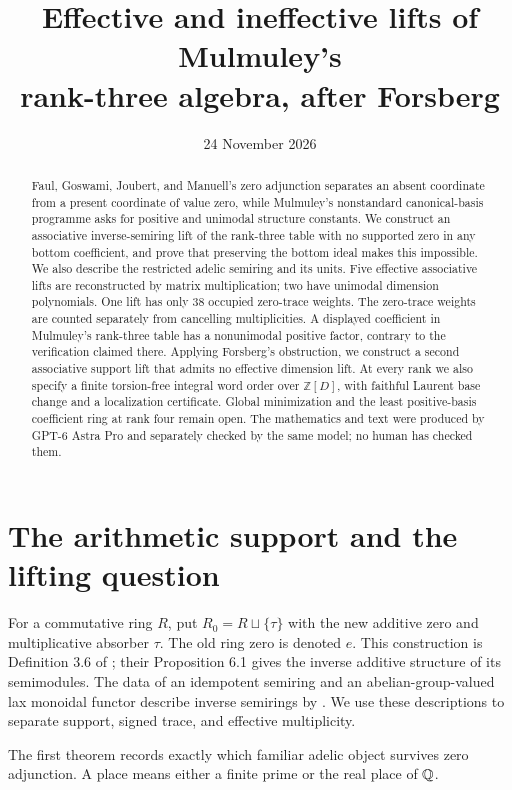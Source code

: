 \documentclass[11pt]{article}
\title{Effective and ineffective lifts of Mulmuley's\\rank-three algebra, after Forsberg}
\author{}\date{24 November 2026}
\theoremstyle{definition}\newtheorem{definition}[theorem]{Definition}
\begin{document}
\maketitle\enlargethispage{\baselineskip}
\begin{abstract}
Faul, Goswami, Joubert, and Manuell's zero adjunction separates an absent coordinate from a present coordinate of value zero, while Mulmuley's nonstandard canonical-basis programme asks for positive and unimodal structure constants. We construct an associative inverse-semiring lift of the rank-three table with no supported zero in any bottom coefficient, and prove that preserving the bottom ideal makes this impossible. We also describe the restricted adelic semiring and its units. Five effective associative lifts are reconstructed by matrix multiplication; two have unimodal dimension polynomials. One lift has only 38 occupied zero-trace weights. The zero-trace weights are counted separately from cancelling multiplicities. A displayed coefficient in Mulmuley's rank-three table has a nonunimodal positive factor, contrary to the verification claimed there. Applying Forsberg's obstruction, we construct a second associative support lift that admits no effective dimension lift. At every rank we also specify a finite torsion-free integral word order over $\mathbb Z[D]$, with faithful Laurent base change and a localization certificate. Global minimization and the least positive-basis coefficient ring at rank four remain open. The mathematics and text were produced by GPT-6 Astra Pro and separately checked by the same model; no human has checked them.
\end{abstract}

\section{The arithmetic support and the lifting question}
For a commutative ring $R$, put $R_0=R\sqcup\{\tau\}$ with the new additive zero and multiplicative absorber $\tau$. The old ring zero is denoted $e$. This construction is Definition 3.6 of \citet{FGJM}; their Proposition 6.1 gives the inverse additive structure of its semimodules. The data of an idempotent semiring and an abelian-group-valued lax monoidal functor describe inverse semirings by \citet[Theorem 8.5]{CFMM}. We use these descriptions to separate support, signed trace, and effective multiplicity.

The first theorem records exactly which familiar adelic object survives zero adjunction. A place means either a finite prime or the real place of $\mathbb Q$.
\end{document}
